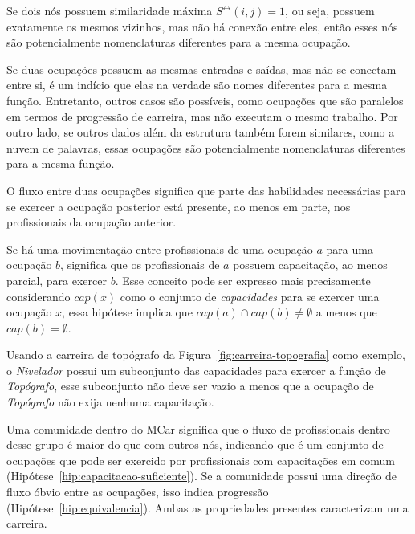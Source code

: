 \documentclass[12pt,a4paper,final]{article}
\newcommand{\linkboth}[1]{#1^\leftrightarrow} %
\newcommand{\capac}{\textit{cap}}
\begin{document}
\begin{hypothesis}
    Se dois nós possuem similaridade máxima $\linkboth{S}(i,j) = 1$, ou seja, possuem exatamente os mesmos vizinhos, mas não há conexão entre eles, então esses nós são potencialmente nomenclaturas diferentes para a mesma ocupação.
\end{hypothesis}

Se duas ocupações possuem as mesmas entradas e saídas, mas não se conectam entre si, é um indício que elas na verdade são nomes diferentes para a mesma função. Entretanto, outros casos são possíveis, como ocupações que são paralelos em termos de progressão de carreira, mas não executam o mesmo trabalho. Por outro lado, se outros dados além da estrutura também forem similares, como a nuvem de palavras, essas ocupações são potencialmente nomenclaturas diferentes para a mesma função.

\begin{hypothesis} \label{hip:capacitacao-suficiente}
    O fluxo entre duas ocupações significa que parte das habilidades necessárias para se exercer a ocupação posterior está presente, ao menos em parte, nos profissionais da ocupação anterior.
\end{hypothesis}

Se há uma movimentação entre profissionais de uma ocupação $a$ para uma ocupação $b$, significa que os profissionais de $a$ possuem capacitação, ao menos parcial, para exercer $b$. Esse conceito pode ser expresso mais precisamente considerando $\capac(x)$ como o conjunto de \textit{capacidades} para se exercer uma ocupação $x$, essa hipótese implica que $\capac(a) \cap \capac(b)  \ne \emptyset$ a menos que $\capac(b) = \emptyset$.

Usando a carreira de topógrafo da Figura~\ref{fig:carreira-topografia} como exemplo, o \textit{Nivelador} possui um subconjunto das capacidades para exercer a função de \textit{Topógrafo}, esse subconjunto não deve ser vazio a menos que a ocupação de \textit{Topógrafo} não exija nenhuma capacitação.

\begin{hypothesis}
    Uma comunidade dentro do MCar significa que o fluxo de profissionais dentro desse grupo é maior do que com outros nós, indicando que é um conjunto de ocupações que pode ser exercido por profissionais com capacitações em comum (Hipótese~\ref{hip:capacitacao-suficiente}). Se a comunidade possui uma direção de fluxo óbvio entre as ocupações, isso indica progressão (Hipótese~\ref{hip:equivalencia}). Ambas as propriedades presentes caracterizam uma carreira.
\end{hypothesis}
\end{document}
